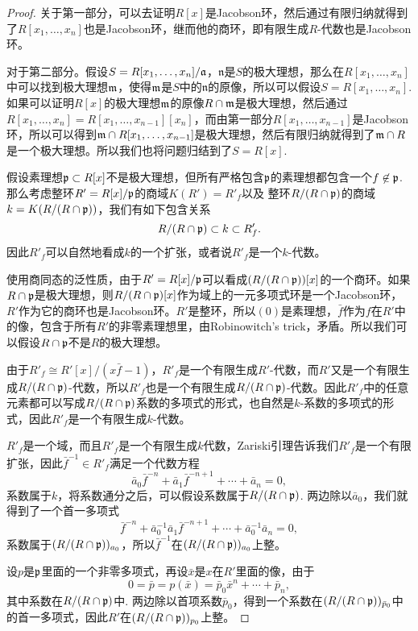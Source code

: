 \begin{proof} 关于第一部分，可以去证明$R[x]$是Jacobson环，然后通过有限归纳就得到了$R[x_1,\dots,x_n]$也是Jacobson环，继而他的商环，即有限生成$R$-代数也是Jacobson环。

对于第二部分。假设$S=R[x_1,\dots,x_n]/\mathfrak{a}$，$\mathfrak{n}$是$S$的极大理想，那么在$R[x_1,\dots,x_n]$中可以找到极大理想$\mathfrak{m}$，使得$\mathfrak{m}$是$S$中的$\mathfrak{n}$的原像，所以可以假设$S=R[x_1,\dots,x_n]$. 如果可以证明$R[x]$的极大理想$\mathfrak{m}$的原像$R\cap \mathfrak{m}$是极大理想，然后通过$R[x_1,\dots,x_{n}]=R[x_1,\dots,x_{n-1}][x_n]$，而由第一部分$R[x_1,\dots,x_{n-1}]$是Jacobson环，所以可以得到$\mathfrak{m}\cap R[x_1,\dots,x_{n-1}]$是极大理想，然后有限归纳就得到了$\mathfrak{m} \cap R$是一个极大理想。所以我们也将问题归结到了$S=R[x]$.

假设素理想$\mathfrak{p}\subset R[x]$不是极大理想，但所有严格包含$\mathfrak{p}$的素理想都包含一个$f\not\in \mathfrak{p}$. 那么考虑整环$R'=R[x]/\mathfrak{p}$的商域$K(R')=R'_f$以及
整环$R/(R\cap \mathfrak{p})$的商域$k=K(R/(R\cap \mathfrak{p}))$，我们有如下包含关系
\[
	R/(R\cap \mathfrak{p})\subset k \subset R'_{f}.
\]
因此$R'_f$可以自然地看成$k$的一个扩张，或者说$R'_f$是一个$k$-代数。

使用商同态的泛性质，由于$R'=R[x]/\mathfrak{p}$可以看成$(R/(R\cap \mathfrak{p}))[x]$的一个商环。如果$R\cap \mathfrak{p}$是极大理想，则$R/(R\cap \mathfrak{p})[x]$作为域上的一元多项式环是一个Jacobson环，$R'$作为它的商环也是Jacobson环。$R'$是整环，所以$(0)$是素理想，$\bar{f}$作为$f$在$R'$中的像，包含于所有$R'$的非零素理想里，由Robinowitch's trick，矛盾。所以我们可以假设$R\cap \mathfrak{p}$不是$R$的极大理想。

由于$R'_f\cong R'[x]/(x\bar{f}-1)$，$R'_f$是一个有限生成$R'$-代数，而$R'$又是一个有限生成$R/(R\cap \mathfrak{p})$-代数，所以$R'_{f}$也是一个有限生成$R/(R\cap \mathfrak{p})$-代数。因此$R'_f$中的任意元素都可以写成$R/(R\cap \mathfrak{p})$系数的多项式的形式，也自然是$k$-系数的多项式的形式，因此$R'_f$是一个有限生成$k$-代数。

$R'_f$是一个域，而且$R'_f$是一个有限生成$k$代数，Zariski引理告诉我们$R'_f$是一个有限扩张，因此$\bar{f}^{-1}\in R'_f$满足一个代数方程
\[
	\bar{a}_0\bar{f}^{-n}+\bar{a}_{1}\bar{f}^{-n+1}+\cdots+\bar{a}_n=0,
\]
系数属于$k$，将系数通分之后，可以假设系数属于$R/(R\cap \mathfrak{p})$. 两边除以$\bar{a}_0$，我们就得到了一个首一多项式
\[
	\bar{f}^{-n}+\bar{a}_0^{-1}\bar{a}_{1}\bar{f}^{-n+1}+\cdots+\bar{a}_0^{-1}\bar{a}_n=0,
\]
系数属于$(R/(R\cap \mathfrak{p}))_{a_0}$，所以$\bar{f}^{-1}$在$(R/(R\cap \mathfrak{p}))_{a_0}$上整。

设$p$是$\mathfrak{p}$里面的一个非零多项式，再设$\bar{x}$是$x$在$R'$里面的像，由于
\[
	0=\bar{p}=p(\bar{x})=\bar{p}_0\bar{x}^n+\cdots+\bar{p}_n,
\]
其中系数在$R/(R\cap \mathfrak{p})$中. 两边除以首项系数$\bar{p}_0$，得到一个系数在$(R/(R\cap \mathfrak{p}))_{\bar{p}_0}$中的首一多项式，因此$R'$在$(R/(R\cap \mathfrak{p}))_{p_0}$上整。


\end{proof}
